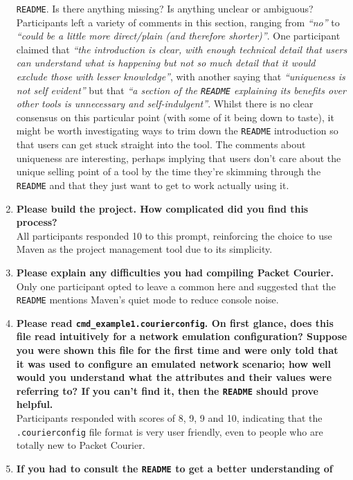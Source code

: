 \begin{enumerate}
{    \texttt{README}. Is there anything missing? Is anything unclear or ambiguous?} \\
    Participants left a variety of comments in this section, ranging from \emph{``no''} to \emph{``could be a little
    more direct/plain (and therefore shorter)''}. One participant claimed that \emph{``the introduction is clear,
        with enough technical detail that users can understand what is happening but not so much detail that it would
        exclude those with lesser knowledge''}, with another saying that \emph{``uniqueness is not self evident''}
    but that \emph{``a section of the \texttt{README} explaining its benefits over other tools is unnecessary and
    self-indulgent''}. Whilst there is no clear consensus on this particular point (with some of it being down to
    taste), it might be worth investigating ways to trim down the \texttt{README} introduction so that users can get
    stuck straight into the tool. The comments about uniqueness are interesting, perhaps implying that users don't care
    about the unique selling point of a tool by the time they're skimming through the \texttt{README} and that they
    just want
    to get to work actually using it.
    \item \textbf{Please build the project. How complicated did you find this process?} \\
    All participants responded 10 to this prompt, reinforcing the choice to use Maven as the project management tool
    due to its simplicity.
    \item \textbf{Please explain any difficulties you had compiling Packet Courier.} \\
    Only one participant opted to leave a common here and suggested that the \texttt{README} mentions Maven's quiet
    mode to reduce console noise.
    \item \textbf{Please read \texttt{cmd\_example1.courierconfig}. On first glance, does this file read intuitively
    for a network emulation configuration? Suppose you were shown this file for the first time and were only told
    that it was used to configure an emulated network scenario; how well would you understand what the attributes and
    their values were referring to? If you can't find it, then the \texttt{README} should prove helpful.} \\
    Participants responded with scores of 8, 9, 9 and 10, indicating that the \texttt{.courierconfig} file format is
    very user friendly, even to people who are totally new to Packet Courier.
    \item \textbf{If you had to consult the \texttt{README} to get a better understanding of
}
\end{enumerate}
